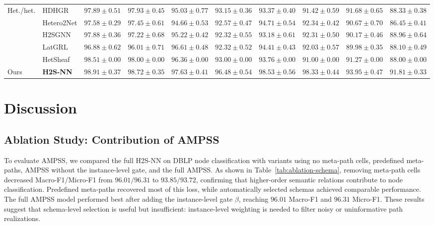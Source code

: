 \documentclass[sigconf,anonymous,review]{acmart}
\newcommand{\method}{\textsc{H2S-NN}}
\newcommand{\ampss}{\textsc{AMPSS}}
\begin{document}
\begin{table}[t]
{\begin{tabular}{llcccccccc}
    \multirow{5}{*}{Het./het.}
    & HDHGR
    & $97.89 \pm 0.51$ & $97.93 \pm 0.45$
    & $95.03 \pm 0.77$ & $93.15 \pm 0.36$
    & $93.37 \pm 0.40$ & $91.42 \pm 0.59$
    & $91.68 \pm 0.65$ & $88.33 \pm 0.38$ \\
    & Hetero2Net
    & $97.58 \pm 0.29$ & $97.45 \pm 0.61$
    & $94.66 \pm 0.53$ & $92.57 \pm 0.47$
    & $94.71 \pm 0.54$ & $92.34 \pm 0.42$
    & $90.67 \pm 0.70$ & $86.45 \pm 0.41$ \\
    & H2SGNN
    & $97.88 \pm 0.36$ & $97.22 \pm 0.68$
    & $95.22 \pm 0.42$ & $92.32 \pm 0.55$
    & $93.18 \pm 0.61$ & $92.31 \pm 0.50$
    & $90.17 \pm 0.46$ & $88.96 \pm 0.64$ \\
    & LatGRL
    & $96.88 \pm 0.62$ & $96.01 \pm 0.71$
    & $96.61 \pm 0.48$ & $92.32 \pm 0.52$
    & $94.41 \pm 0.43$ & $92.03 \pm 0.57$
    & $89.98 \pm 0.35$ & $88.10 \pm 0.49$ \\
    & HetSheaf
    & $98.51 \pm 0.00$ & $98.00 \pm 0.00$
    & $96.36 \pm 0.00$ & $93.00 \pm 0.00$
    & $93.76 \pm 0.00$ & $91.00 \pm 0.00$
    & $91.27 \pm 0.00$ & $88.00 \pm 0.00$ \\
    \midrule

    Ours
    & \textbf{\method{}}
    & $\mathbf{98.91 \pm 0.37}$ & $\mathbf{98.72 \pm 0.35}$
    & $\mathbf{97.63 \pm 0.41}$ & $\mathbf{96.48 \pm 0.54}$ 
    & $\mathbf{98.53 \pm 0.56}$ & $\mathbf{98.33 \pm 0.44}$
    & $\mathbf{93.95 \pm 0.47}$ & $\mathbf{91.81 \pm 0.33}$  \\
    \bottomrule
  \end{tabular}%
  }
\end{table}

\section{Discussion}
\label{sec:analysis-results}

\subsection{Ablation Study: Contribution of {\ampss{}}}

To evaluate \ampss{}, we compared the full \method{} on DBLP node classification with variants using no meta-path cells, predefined meta-paths, \ampss{} without the instance-level gate, and the full \ampss{}. As shown in Table~\ref{tab:ablation-schema}, removing meta-path cells decreased Macro-F1/Micro-F1 from $96.01/96.31$ to $93.85/93.72$, confirming that higher-order semantic relations contribute to node classification. Predefined meta-paths recovered most of this loss, while automatically selected schemas achieved comparable performance. The full \ampss{} model performed best after adding the instance-level gate $\beta$, reaching $96.01$ Macro-F1 and $96.31$ Micro-F1. These results suggest that schema-level selection is useful but insufficient: instance-level weighting is needed to filter noisy or uninformative path realizations.
\end{document}
